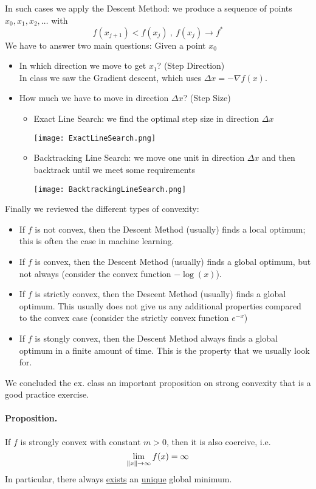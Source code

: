 \documentclass[answers]{exam}
\begin{document}
    In such cases we apply the Descent Method: we produce a sequence of points $x_0, x_1, x_2, \ldots$ with 
    $$ f(x_{j+1}) < f(x_j)\ ,\ f(x_j) \to f^* $$
    We have to answer two main questions: Given a point $x_0$
    \begin{itemize}
        \item In which direction we move to get $x_1$? (Step Direction)\\
        In class we saw the Gradient descent, which uses $\Delta x = -\nabla f(x)$.
        \item How much we have to move in direction $\Delta x$? (Step Size)
        \begin{itemize}
            \item Exact Line Search: we find the optimal step size in direction $\Delta x$
            \begin{center}
                \texttt{[image: ExactLineSearch.png]}
            \end{center}
            \item Backtracking Line Search: we move one unit in direction $\Delta x$ and then backtrack until we meet some requirements 
            \begin{center}
                \texttt{[image: BacktrackingLineSearch.png]}
            \end{center}
        \end{itemize}
    \end{itemize}
    Finally we reviewed the different types of convexity:
    \begin{itemize}
        \item If $f$ is not convex, then the Descent Method (usually) finds a local optimum; this is often the case in machine learning.
        \item If $f$ is convex, then the Descent Method (usually) finds a global optimum, but not always (consider the convex function $-\log(x)$).
        \item If $f$ is strictly convex, then the Descent Method (usually) finds a global optimum. This usually does not give us any additional properties compared to the convex case (consider the strictly convex function $e^{-x}$)
        \item If $f$ is stongly convex, then the Descent Method always finds a global optimum in a finite amount of time. This is the property that we usually look for.
    \end{itemize}
    We concluded the ex. class an important proposition on strong convexity that is a good practice exercise.
    \paragraph{Proposition.} If $f$ is strongly convex with constant $m > 0$, then it is also coercive, i.e.
    $$ \lim_{\left\lVert x \right\rVert \to \infty} f(x) = \infty $$
    In particular, there always \underline{exists} an \underline{unique} global minimum. 
\end{document}

